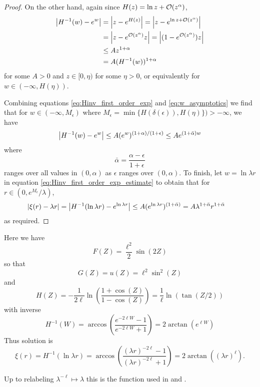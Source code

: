 \documentclass{amsart}
\begin{document}
\begin{proof}
On the other hand, again since \(H(z) = \ln z + \operatorname{\mathcal{O}}(z^{\alpha})\),
\begin{equation}
\label{eq:w_asymptotics}
\begin{split}
\left|{H^{-1}(w) - e^w}\right| &= \left|{z - e^{H(z)}}\right| = \left|{z - e^{\ln z + \operatorname{\mathcal{O}}(z^{\alpha})}}\right| \\
&= \left|{z - e^{\operatorname{\mathcal{O}}(z^{\alpha})} z}\right| = \left|{(1 - e^{\operatorname{\mathcal{O}}(z^{\alpha})})z}\right| \\
&\leq A z^{1+\alpha} \\
&= A (H^{-1}(w))^{1+\alpha}
\end{split}
\end{equation}
for some \(A > 0\) and \(z \in [0, \eta)\) for some \(\eta > 0\), or equivalently for \(w \in (-\infty, H(\eta))\).

Combining equations \eqref{eq:Hinv_first_order_exp} and \eqref{eq:w_asymptotics} we find that for \(w \in (-\infty, M_{\epsilon})\) where \(M_{\epsilon} = \min\{H(\delta(\epsilon)), H(\eta)\}) > - \infty\), we have
\begin{equation}
\label{eq:Hinv_first_order_exp_estimate}
\left|{H^{-1}(w) - e^w}\right| \leq A (e^w)^{(1+\alpha)/(1+\epsilon)} \leq A e^{(1+\bar{\alpha}) w}
\end{equation}
where
\[
\bar{\alpha} = \frac{\alpha - \epsilon}{1 + \epsilon}
\]
ranges over all values in \((0, \alpha)\) as \(\epsilon\) ranges over \((0, \alpha)\). To finish, let \(w = \ln \lambda r\) in equation \eqref{eq:Hinv_first_order_exp_estimate} to obtain that for \(r \in (0, e^{M_{\epsilon}}/\lambda)\),
\[
\begin{split}
\left|{\xi(r) - \lambda r}\right| &= \left|{H^{-1} (\ln \lambda r) - e^{\ln \lambda r}}\right| \leq A (e^{\ln \lambda r})^{(1 + \bar{\alpha})} = A\lambda^{1+\bar{\alpha}} r^{1+\bar{\alpha}}
\end{split}
\]
as required.
\end{proof}

\begin{example}

Here we have
\[
F(Z) = \frac{\ell^2}{2} \sin(2Z)
\]
so that
\[
G(Z) = u(Z) = \ell^2 \sin^2(Z)
\]
and
\[
H(Z) = -\frac{1}{2\ell} \ln \left(\frac{1+\cos(Z)}{1-\cos(Z)}\right) = \frac{1}{\ell}\ln \left(\tan(Z/2)\right)
\]
with inverse
\[
H^{-1}(W) = \arccos\left(\frac{e^{-2\ell W} - 1}{e^{-2\ell W} + 1}\right) = 2 \arctan(e^{\ell W})
\]
Thus solution is
\[
\xi(r) = H^{-1} (\ln \lambda r) = \arccos\left(\frac{(\lambda r)^{-2\ell} - 1}{(\lambda r)^{-2\ell} + 1}\right) = 2\arctan((\lambda r)^{\ell}).
\]

Up to relabeling \(\lambda^{-\ell} \mapsto \lambda\) this is the function used in \cite{MR1180392} and \cite{MR2332425}.
\end{example}
\end{document}
